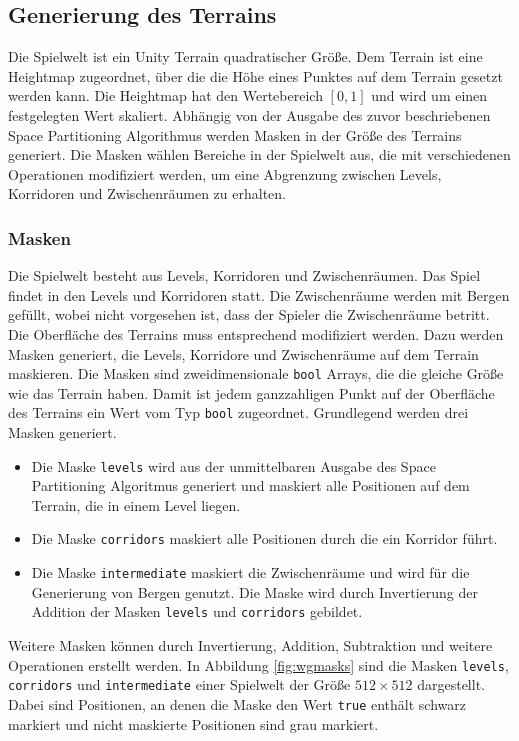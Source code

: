\subsection{Generierung des Terrains}
Die Spielwelt ist ein Unity Terrain quadratischer Größe. Dem Terrain ist eine Heightmap zugeordnet, über die die Höhe eines Punktes auf dem Terrain gesetzt werden kann. Die Heightmap hat den Wertebereich $[0,1]$ und wird um einen festgelegten Wert skaliert. Abhängig von der Ausgabe des zuvor beschriebenen Space Partitioning Algorithmus werden Masken in der Größe des Terrains generiert. Die Masken wählen Bereiche in der Spielwelt aus, die mit verschiedenen Operationen modifiziert werden, um eine Abgrenzung zwischen Levels, Korridoren und Zwischenräumen zu erhalten.
\subsubsection{Masken}
Die Spielwelt besteht aus Levels, Korridoren und Zwischenräumen. Das Spiel findet in den Levels und Korridoren statt. Die Zwischenräume werden mit Bergen gefüllt, wobei nicht vorgesehen ist, dass der Spieler die Zwischenräume betritt. Die Oberfläche des Terrains muss entsprechend modifiziert werden. Dazu werden Masken generiert, die Levels, Korridore und Zwischenräume auf dem Terrain maskieren. Die Masken sind zweidimensionale \texttt{bool} Arrays, die die gleiche Größe wie das Terrain haben. Damit ist jedem ganzzahligen Punkt auf der Oberfläche des Terrains ein Wert vom Typ \texttt{bool} zugeordnet. Grundlegend werden drei Masken generiert. \begin{itemize}
    \item Die Maske \texttt{levels} wird aus der unmittelbaren Ausgabe des Space Partitioning Algoritmus generiert und maskiert alle Positionen auf dem Terrain, die in einem Level liegen.
    \item Die Maske \texttt{corridors} maskiert alle Positionen durch die ein Korridor führt.
    \item Die Maske \texttt{intermediate} maskiert die Zwischenräume und wird für die Generierung von Bergen genutzt. Die Maske wird durch Invertierung der Addition der Masken \texttt{levels} und \texttt{corridors} gebildet.
\end{itemize}
Weitere Masken können durch Invertierung, Addition, Subtraktion und weitere Operationen erstellt werden. In Abbildung \ref{fig:wgmasks} sind die Masken \texttt{levels}, \texttt{corridors} und \texttt{intermediate} einer Spielwelt der Größe $512\times 512$ dargestellt. Dabei sind Positionen, an denen die Maske den Wert \texttt{true} enthält schwarz markiert und nicht maskierte Positionen sind grau markiert.

